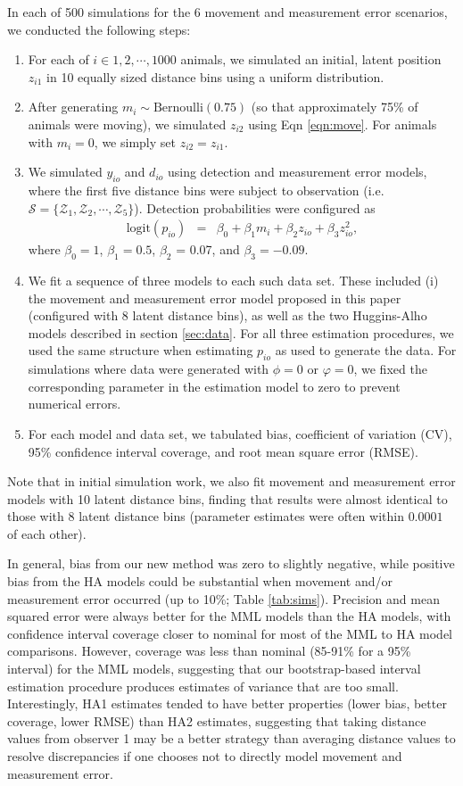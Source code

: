 \documentclass[12pt,fleqn]{article}
\begin{document}
In each of 500 simulations for the 6 movement and measurement error scenarios, we conducted the following steps:
\begin{enumerate}
  \item For each of $i \in 1,2,\cdots,1000$ animals, we simulated an initial, latent position $z_{i1}$ in 10 equally sized distance bins using a uniform distribution.
  \item After generating $m_i \sim \text{Bernoulli}(0.75)$ (so that approximately 75\% of animals were moving), we simulated $z_{i2}$ using Eqn \ref{eqn:move}.  For animals with $m_i=0$, we simply set $z_{i2}=z_{i1}$.
  \item We simulated $y_{io}$ and $d_{io}$ using detection and measurement error models, where the first five distance bins were subject to observation (i.e. $\mathcal{S} = \{ \mathcal{Z}_1, \mathcal{Z}_2, \cdots, \mathcal{Z}_5 \} $).  Detection probabilities were configured as
      \begin{eqnarray*}
        \text{logit}(p_{io}) & = & \beta_0 + \beta_1 m_i + \beta_2 z_{io} + \beta_3 z_{io}^2,
      \end{eqnarray*}
      where $\beta_0 = 1$, $\beta_1 = 0.5$, $\beta_2$ = 0.07, and $\beta_3 = -0.09$.
  \item We fit a sequence of three models to each such data set.  These included (i) the movement and measurement error model proposed in this paper (configured with 8 latent distance bins), as well as the two Huggins-Alho models described in section \ref{sec:data}. For all three estimation procedures, we used the same structure when estimating $p_{io}$ as used to generate the data.  For simulations where data were generated with $\phi=0$ or $\varphi=0$, we fixed the corresponding parameter in the estimation model to zero to prevent numerical errors.
  \item For each model and data set, we tabulated bias, coefficient of variation (CV), 95\% confidence interval coverage, and root mean square error (RMSE).
\end{enumerate}
Note that in initial simulation work, we also fit movement and measurement error models with 10 latent distance bins, finding that results were almost identical to those with 8 latent distance bins (parameter estimates were often within $0.0001$ of each other).

In general, bias from our new method was zero to slightly negative, while positive bias from the HA models could be substantial when movement and/or measurement error occurred (up to 10\%; Table \ref{tab:sims}).  Precision and mean squared error were always better for the MML models than the HA models, with  confidence interval coverage closer to nominal for most of the MML to HA model comparisons.  However, coverage was less than nominal (85-91\% for a 95\% interval) for the MML models, suggesting that our bootstrap-based interval estimation procedure produces estimates of variance that are too small.  Interestingly, HA1 estimates tended to have better properties (lower bias, better coverage, lower RMSE) than HA2 estimates, suggesting that taking distance values from observer 1 may be a better strategy than averaging distance values to resolve discrepancies if one chooses not to directly model movement and measurement error.
\end{document}
